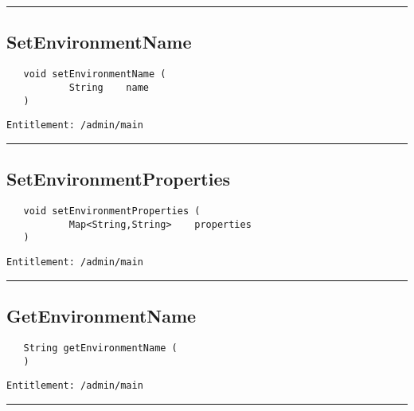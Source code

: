 \rule{12cm}{2pt}
\subsection{SetEnvironmentName}
\label{Api:SetEnvironmentName}
\begin{Verbatim}
   void setEnvironmentName (
           String    name
   )
\end{Verbatim}
\begin{Verbatim}[formatcom=\color{Maroon}]
  Entitlement: /admin/main
\end{Verbatim}



\rule{12cm}{2pt}
\subsection{SetEnvironmentProperties}
\label{Api:SetEnvironmentProperties}
\begin{Verbatim}
   void setEnvironmentProperties (
           Map<String,String>    properties
   )
\end{Verbatim}
\begin{Verbatim}[formatcom=\color{Maroon}]
  Entitlement: /admin/main
\end{Verbatim}



\rule{12cm}{2pt}
\subsection{GetEnvironmentName}
\label{Api:GetEnvironmentName}
\begin{Verbatim}
   String getEnvironmentName (
   )
\end{Verbatim}
\begin{Verbatim}[formatcom=\color{Maroon}]
  Entitlement: /admin/main
\end{Verbatim}



\rule{12cm}{2pt}
